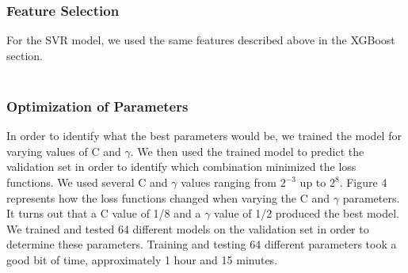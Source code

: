 \usepackage{fancyhdr}\documentclass[conference]{IEEEtran}
\begin{document}
\subsubsection{Feature Selection}
For the SVR model, we used the same features described above in the XGBoost section.
\\
\\
\subsubsection{Optimization of Parameters}
In order to identify what the best parameters would be, we trained the model for varying values of C and $\gamma$. We then used the trained model to predict the validation set in order to identify which combination minimized the loss functions. We used several C and $\gamma$ values ranging from $2^{-3}$ up to $2^8$. Figure 4 represents how the loss functions changed when varying the C and $\gamma$ parameters. It turns out that a C value of 1/8 and a $\gamma$ value of 1/2 produced the best model. We trained and tested 64 different models on the validation set in order to determine these parameters. Training and testing 64 different parameters took a good bit of time, approximately 1 hour and 15 minutes. 
\\
\\
\end{document}
